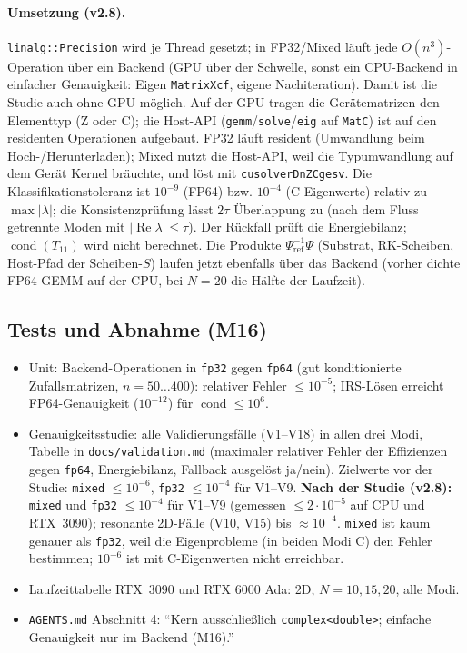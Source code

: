\paragraph{Umsetzung (v2.8).} \verb|linalg::Precision| wird je Thread gesetzt; in FP32/Mixed läuft jede
$O(n^3)$-Operation über ein Backend (GPU über der Schwelle, sonst ein CPU-Backend in einfacher Genauigkeit: Eigen
\verb|MatrixXcf|, eigene Nachiteration). Damit ist die Studie auch ohne GPU möglich. Auf der GPU tragen die
Gerätematrizen den Elementtyp (Z oder C); die Host-API (\verb|gemm|/\verb|solve|/\verb|eig| auf \verb|MatC|) ist auf
den residenten Operationen aufgebaut. FP32 läuft resident (Umwandlung beim Hoch-/Herunterladen); Mixed nutzt die
Host-API, weil die Typumwandlung auf dem Gerät Kernel bräuchte, und löst mit \verb|cusolverDnZCgesv|. Die
Klassifikationstoleranz ist $10^{-9}$ (FP64) bzw. $10^{-4}$ (C-Eigenwerte) relativ zu $\max|\lambda|$; die
Konsistenzprüfung lässt $2\tau$ Überlappung zu (nach dem Fluss getrennte Moden mit $|\operatorname{Re}\lambda|\le\tau$).
Der Rückfall prüft die Energiebilanz; $\operatorname{cond}(T_{11})$ wird nicht berechnet. Die Produkte
$\Psi_{\text{ref}}^{-1}\Psi$ (Substrat, RK-Scheiben, Host-Pfad der Scheiben-$S$) laufen jetzt ebenfalls über das Backend
(vorher dichte FP64-GEMM auf der CPU, bei $N=20$ die Hälfte der Laufzeit).

\subsection{Tests und Abnahme (M16)}
\begin{itemize}[nosep]
  \item Unit: Backend-Operationen in \verb|fp32| gegen \verb|fp64| (gut konditionierte Zufallsmatrizen, $n=50\dots400$):
        relativer Fehler $\le10^{-5}$; IRS-Lösen erreicht FP64-Genauigkeit ($10^{-12}$) für $\operatorname{cond}\le10^6$.
  \item Genauigkeitsstudie: alle Validierungsfälle (V1--V18) in allen drei Modi, Tabelle in \verb|docs/validation.md|
        (maximaler relativer Fehler der Effizienzen gegen \verb|fp64|, Energiebilanz, Fallback ausgelöst ja/nein).
        Zielwerte vor der Studie: \verb|mixed| $\le10^{-6}$, \verb|fp32| $\le10^{-4}$ für V1--V9. \textbf{Nach der Studie
        (v2.8):} \verb|mixed| und \verb|fp32| $\le10^{-4}$ für V1--V9 (gemessen $\le2\cdot10^{-5}$ auf CPU und RTX~3090);
        resonante 2D-Fälle (V10, V15) bis $\approx10^{-4}$. \verb|mixed| ist kaum genauer als \verb|fp32|, weil die
        Eigenprobleme (in beiden Modi C) den Fehler bestimmen; $10^{-6}$ ist mit C-Eigenwerten nicht erreichbar.
  \item Laufzeittabelle RTX~3090 und RTX 6000 Ada: 2D, $N=10,15,20$, alle Modi.
  \item \verb|AGENTS.md| Abschnitt 4: \enquote{Kern ausschließlich \texttt{complex<double>}; einfache Genauigkeit nur im
        Backend (M16).}
\end{itemize}

